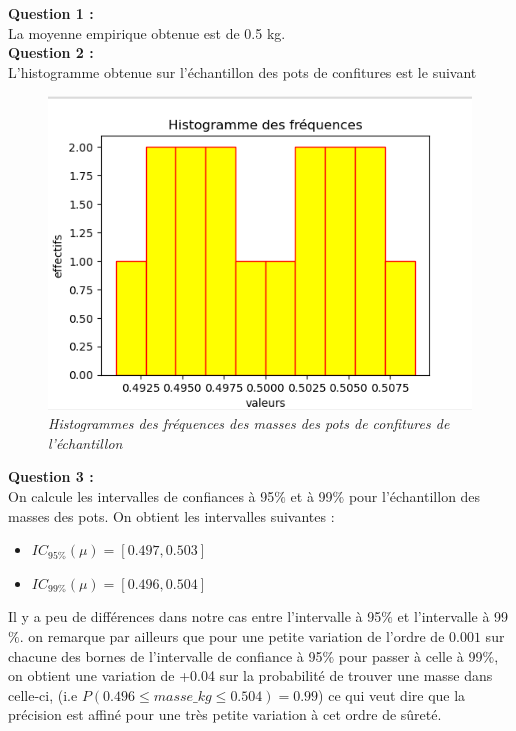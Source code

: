\documentclass{article}      %
\begin{document}
\textbf{Question 1 :} \\ La moyenne empirique obtenue est de 0.5 kg.\\
\textbf{Question 2 :} \\ L'histogramme obtenue sur l'échantillon des pots de confitures est le suivant\\

\begin{figure}[H]
    \centering
     \scalebox{.75}
     {
     	\includegraphics[scale=1]{img/histogr_frequ_masses_pots.png} 
     }
     \\
     \textit{Histogrammes des fréquences des masses des pots de confitures de l'échantillon}
\end{figure}

\textbf{Question 3 :} \\ On calcule les intervalles de confiances à 95$\%$ et à 99$\%$ pour l'échantillon des masses des pots. On obtient les intervalles suivantes : \\

\begin{center}
	\begin{itemize}
		\item $IC_{95\%}(\mu) = [0.497, 0.503]$
		\item $IC_{99\%}(\mu) = [0.496, 0.504]$
	\end{itemize}
\end{center} 

Il y a peu de différences dans notre cas entre l'intervalle à 95$\%$ et l'intervalle à 99$\%$. on remarque par ailleurs que pour une petite variation de l'ordre de $0.001$ sur chacune des bornes de l'intervalle de confiance à 95$\%$ pour passer à celle à 99$\%$, on obtient une variation de +0.04 sur la probabilité de trouver une masse dans celle-ci, (i.e $P(0.496 \le masse\_kg \le 0.504) = 0.99$) ce qui veut dire que la précision est affiné pour une très petite variation à cet ordre de sûreté.\\
\end{document}
